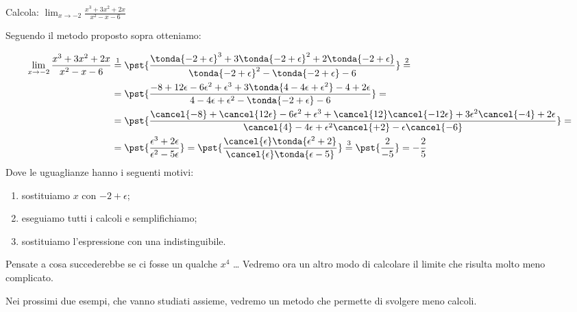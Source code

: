 \begin{esempio}
Calcola: \quad 
  \(\displaystyle \lim_{x \rightarrow -2} \frac{x^3+3x^2+2x}{x^2-x-6}\)
 
Seguendo il metodo proposto sopra otteniamo:

\begin{align*}
\lim_{x \rightarrow -2} \frac{x^3+3x^2+2x}{x^2-x-6} & \stackrel{1}{=} 
\pst{\frac
  {\tonda{-2+\epsilon}^3+3\tonda{-2+\epsilon}^2+2\tonda{-2+\epsilon}}
  {\tonda{-2+\epsilon}^2-\tonda{-2+\epsilon}-6}} \stackrel{2}{=}\\ 
  &=\pst{\frac{-8+12\epsilon-6\epsilon^2+\epsilon^3+
             3\tonda{4-4\epsilon+\epsilon^2}-4+2\epsilon}
             {4-4\epsilon+\epsilon^2-\tonda{-2+\epsilon}-6}} =\\ 
  &=\pst{\frac{\cancel{-8}+\cancel{12\epsilon}-6\epsilon^2+\epsilon^3+
          \cancel{12}\cancel{-12\epsilon}+3\epsilon^2\cancel{-4}+2\epsilon}
             {\cancel{4}-4\epsilon+
              \epsilon^2\cancel{+2}-\epsilon\cancel{-6}}}=\\ 
  &=\pst{\frac{\epsilon^3+2\epsilon}{\epsilon^2-5\epsilon}} = 
    \pst{\frac{\cancel{\epsilon} \tonda{\epsilon^2+2}}
             {\cancel{\epsilon} \tonda{\epsilon-5}}}  \stackrel{3}{=} 
    \pst{\frac{2}{-5}} = -\frac{2}{5}
\end{align*}
Dove le uguaglianze hanno i seguenti motivi:
\begin{enumerate} [nosep]
 \item sostituiamo \(x\) con \(-2+\epsilon\);
 \item eseguiamo tutti i calcoli e semplifichiamo;
 \item sostituiamo l'espressione con una indistinguibile.
\end{enumerate}
\end{esempio}

\begin{osservazione}
Pensate a cosa succederebbe se ci fosse un qualche \(x^4\) \dots
Vedremo ora un altro modo di calcolare il limite che risulta molto meno 
complicato.

Nei prossimi due esempi, che vanno studiati assieme, vedremo un metodo che 
permette di svolgere meno calcoli.
\end{osservazione}

% 
% 


